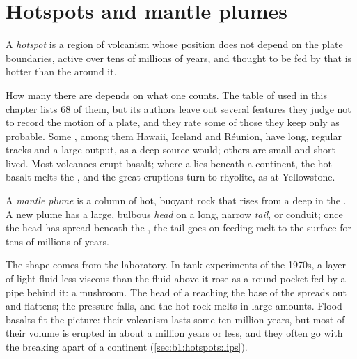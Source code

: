 \section{Hotspots and mantle plumes}\label{sec:b1:hotspots:plumes}

\begin{definition}[Hotspot]\label{def:b1:hotspots:hotspot}
A \emph{hotspot} is a region of volcanism whose position does
not depend on the plate boundaries, active over tens of millions of years,
and thought to be fed by  that is hotter than the  around it.
\end{definition}

How many  there are depends on what one counts. The table of 
used in this chapter lists 68 of them, but its authors leave out several
features they judge not to record the motion of a plate, and they rate some of
those they keep only as probable. Some , among them Hawaii, Iceland and
Réunion, have long, regular tracks and a large output, as a deep source
would; others are small and short-lived. Most  volcanoes erupt basalt;
where a  lies beneath a continent, the hot basalt melts the , and
the great eruptions turn to rhyolite, as at Yellowstone.

\begin{definition}\label{def:b1:hotspots:plume}
A \emph{mantle plume} is a column of hot, buoyant 
rock that rises from a  deep in the . A new plume
has a large, bulbous \emph{head} on a long, narrow \emph{tail}, or conduit; once
the head has spread beneath the , the tail goes on feeding melt to
the surface for tens of millions of years.
\end{definition}

The shape comes from the laboratory. In tank experiments of the 1970s, a layer
of light fluid less viscous than the fluid above it rose as a round pocket fed
by a pipe behind it: a mushroom. The head of a  reaching the base
of the  spreads out and flattens; the pressure falls, and the hot
rock melts in large amounts. Flood basalts fit the picture: their volcanism
lasts some ten million years, but most of their volume is erupted in about a
million years or less, and they often go with the breaking apart of a
continent (\cref{sec:b1:hotspots:lips}).

